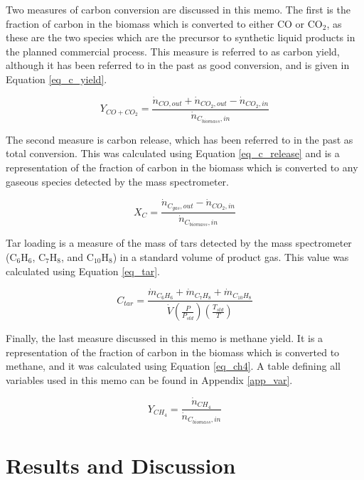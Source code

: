 \documentclass[11pt,twocolumn]{article}
\begin{document}
Two measures of carbon conversion are discussed in this memo.  The first is the fraction of carbon in the biomass which is converted to either CO or CO$_2$, as these are the two species which are the precursor to synthetic liquid products in the planned commercial process.  This measure is referred to as carbon yield, although it has been referred to in the past as good conversion, and is given in Equation \ref{eq_c_yield}.

\begin{equation}
	Y_{CO+CO_2} = \frac{\dot{n}_{CO,out}+\dot{n}_{CO_2,out} - \dot{n}_{CO_2,in}}{\dot{n}_{C_{biomass},in}}
	\label{eq_c_yield}
\end{equation}

The second measure is carbon release, which has been referred to in the past as total conversion.  This was calculated using Equation \ref{eq_c_release} and is a representation of the fraction of carbon in the biomass which is converted to any gaseous species detected by the mass spectrometer.

\begin{equation}
	X_{C} = \frac{\dot{n}_{C_{gas},out}- \dot{n}_{CO_2,in}}{\dot{n}_{C_{biomass},in}}
	\label{eq_c_release}
\end{equation}

Tar loading is a measure of the mass of tars detected by the mass spectrometer (C$_6$H$_6$, C$_7$H$_8$, and C$_{10}$H$_8$) in a standard volume of product gas.  This value was calculated using Equation \ref{eq_tar}.

\begin{equation}
	C_{tar} = \frac{\dot{m}_{C_6H_6}+\dot{m}_{C_7H_8} + \dot{m}_{C_{10}H_8}}{\dot{V}(\frac{P}{P_{std}})(\frac{T_{std}}{T})}
	\label{eq_tar}
\end{equation}

Finally, the last measure discussed in this memo is methane yield.  It is a representation of the fraction of carbon in the biomass which is converted to methane, and it was calculated using Equation \ref{eq_ch4}.  A table defining all variables used in this memo can be found in Appendix \ref{app_var}.

\begin{equation}
	Y_{CH_4} = \frac{\dot{n}_{CH_4}}{\dot{n}_{C_{biomass},in}}
	\label{eq_ch4}
\end{equation}


\section*{Results and Discussion}
\end{document}
